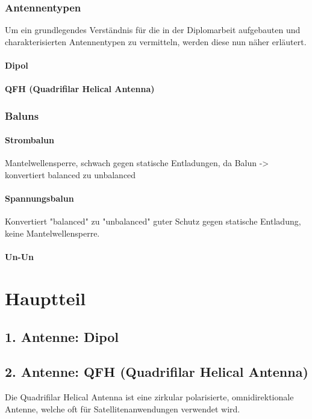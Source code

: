 \documentclass[12pt]{scrreprt}
\begin{document}
	\subsection{Antennentypen}
	Um ein grundlegendes Verständnis für die in der Diplomarbeit aufgebauten und charakterisierten Antennentypen zu vermitteln, werden diese nun näher erläutert.
	
	\subsubsection{Dipol}
		
	\subsubsection{QFH (Quadrifilar Helical Antenna)}
	
	\subsection{Baluns}
	
	\subsubsection{Strombalun}
	Mantelwellensperre, schwach gegen statische Entladungen, da Balun -> konvertiert balanced zu unbalanced 
	
	\subsubsection{Spannungsbalun}
	Konvertiert "balanced" zu "unbalanced" guter Schutz gegen statische Entladung, keine Mantelwellensperre.
	
	\subsubsection{Un-Un}
	
	
	\pagebreak
	
	\chapter{Hauptteil}
	\section{1. Antenne: Dipol}
	
	\section{2. Antenne: QFH (Quadrifilar Helical Antenna)}
	Die Quadrifilar Helical Antenna ist eine zirkular polarisierte, omnidirektionale Antenne, welche oft für Satellitenanwendungen verwendet wird.\\
	
\end{document}
